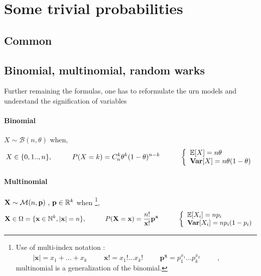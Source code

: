 \documentclass[a4paper,10pt]{article}
\begin{document}
\begin{center}\end{center}
\section{Some trivial probabilities}

\subsection{Common}

\subsection{Binomial, multinomial, random warks}
Further remaining the formulas, one has to reformulate the urn models and understand the signification of variables
\paragraph{Binomial} $X\sim \mathcal{B}(n,\theta)$ when,
\[
X \in \{0,1 .. , n\} , 
\hspace{10mm}
P(X=k)=C^k_n\theta ^k (1-\theta)^{n-k} 
\hspace{10mm}
\left\{
\begin{array}{l}
\mathbb{E}[X]=n\theta \\
\textbf{Var}[X]=n \theta (1-\theta) 
\end{array}\right.
\]
\paragraph{Multinomial}  $ \textbf{X} \sim \mathcal{M}(n,\textbf{p} ) \hbox{ , } \textbf{p}\in \mathbb{R}^k $ when \footnote{Use of multi-index notation : $ \hspace{1cm} |\textbf{x}|=x_1 + ... + x_k \hspace{1cm} \textbf{x}!=x_1! ... x_k!  \hspace{1cm} \textbf{p}^{\textbf{x}} = p_1^{x_1}...p_k^{x_k}  \hspace{1cm} $, multinomial is a generalization of the binomial.},
\[
\textbf{X} \in \Omega = \{ \textbf{x} \in \mathbb{N}^k, |\textbf{x}| = n \} , 
\hspace{10mm}
P(\textbf{X}=\textbf{x})= \frac{n!}{\textbf{x}!}\textbf{p}^{\textbf{x}}
\hspace{10mm}
\left\{
\begin{array}{l}
\mathbb{E}[X_i]=np_i \\
\textbf{Var}[X_i]=n p_i (1-p_i) 
\end{array}\right.
\]
\end{document}
